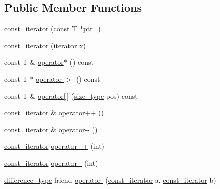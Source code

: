 \subsection*{Public Member Functions}
\begin{DoxyCompactItemize}
\item 
\mbox{\hyperlink{classprevector_1_1const__iterator_a5a7f492e60f6ee79e7c9b0f16c7d4654}{const\+\_\+iterator}} (const T $\ast$ptr\+\_\+)
\item 
\mbox{\hyperlink{classprevector_1_1const__iterator_af91d6360990673012611eda7e167414c}{const\+\_\+iterator}} (\mbox{\hyperlink{classprevector_1_1iterator}{iterator}} x)
\item 
const T \& \mbox{\hyperlink{classprevector_1_1const__iterator_abb156920ba8f36757925eb258be080d4}{operator$\ast$}} () const
\item 
const T $\ast$ \mbox{\hyperlink{classprevector_1_1const__iterator_ae3f7014dba7dfa630b1f094bb53074ac}{operator-\/$>$}} () const
\item 
const T \& \mbox{\hyperlink{classprevector_1_1const__iterator_ac15fe13f4a08c2c76fc1ee45ec73db51}{operator\mbox{[}$\,$\mbox{]}}} (\mbox{\hyperlink{classprevector_a7e0da95e6d1c878f6eeb572f4fc12524}{size\+\_\+type}} pos) const
\item 
\mbox{\hyperlink{classprevector_1_1const__iterator}{const\+\_\+iterator}} \& \mbox{\hyperlink{classprevector_1_1const__iterator_a4f634cfafc2c49e52172dafcb470db27}{operator++}} ()
\item 
\mbox{\hyperlink{classprevector_1_1const__iterator}{const\+\_\+iterator}} \& \mbox{\hyperlink{classprevector_1_1const__iterator_a5809a0ea5a3536795de20e617247d060}{operator-\/-\/}} ()
\item 
\mbox{\hyperlink{classprevector_1_1const__iterator}{const\+\_\+iterator}} \mbox{\hyperlink{classprevector_1_1const__iterator_a52a778f9a0f3556eab278698a1c97683}{operator++}} (int)
\item 
\mbox{\hyperlink{classprevector_1_1const__iterator}{const\+\_\+iterator}} \mbox{\hyperlink{classprevector_1_1const__iterator_a37d0e4597843c23ba8e31e5526851728}{operator-\/-\/}} (int)
\item 
\mbox{\hyperlink{classprevector_1_1const__iterator_a8c3d9b22578d2b87f14513d523b151e9}{difference\+\_\+type}} friend \mbox{\hyperlink{classprevector_1_1const__iterator_a73e83a22f94bc5b9c48f25ef0bd27ce3}{operator-\/}} (\mbox{\hyperlink{classprevector_1_1const__iterator}{const\+\_\+iterator}} a, \mbox{\hyperlink{classprevector_1_1const__iterator}{const\+\_\+iterator}} b)

\end{DoxyCompactItemize}

